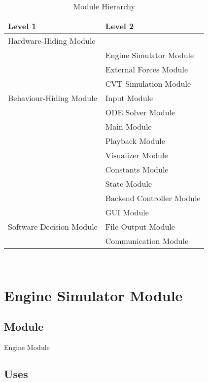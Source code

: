 \documentclass[12pt, titlepage]{article}
\begin{document}
\begin{table}[h!]
\centering
\begin{tabular}{p{} p{}}
\toprule
\textbf{Level 1} & \textbf{Level 2}\\
\midrule

{Hardware-Hiding Module} & ~ \\
\midrule

\multirow{7}{0.3\textwidth}{Behaviour-Hiding Module}
& Engine Simulator Module\\
& External Forces Module\\
& CVT Simulation Module\\
& Input Module\\
& ODE Solver Module\\
& Main Module\\ 
& Playback Module\\
& Visualizer Module\\
& Constants Module\\
& State Module\\
& Backend Controller Module\\
\midrule

\multirow{3}{0.3\textwidth}{Software Decision Module}
& GUI Module\\
& File Output Module\\
& Communication Module\\
\bottomrule

\end{tabular}
\caption{Module Hierarchy}
\label{TblMH}
\end{table}

\newpage
~\newpage

\section{Engine Simulator Module} \label{Module_engine_simulator} 



\subsection{Module}

Engine Module

\subsection{Uses}
\end{document}
